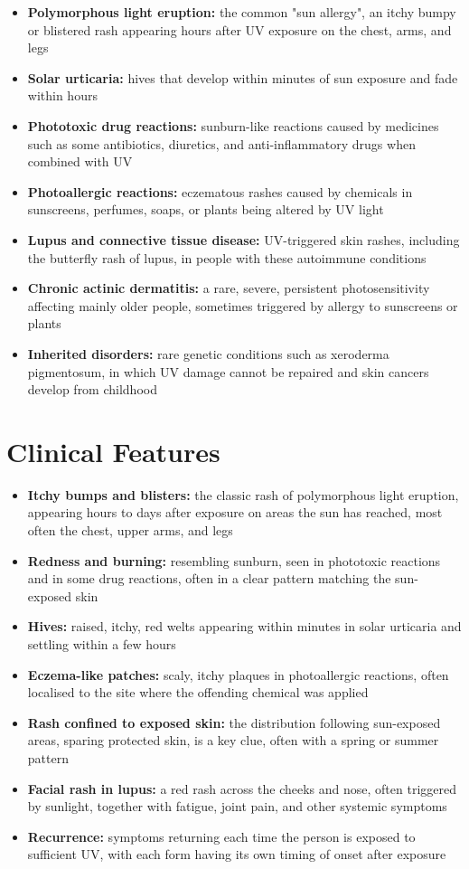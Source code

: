 \begin{itemize}
    \item \textbf{Polymorphous light eruption:} the common "sun allergy", an itchy bumpy or blistered rash appearing hours after UV exposure on the chest, arms, and legs
    \item \textbf{Solar urticaria:} hives that develop within minutes of sun exposure and fade within hours
    \item \textbf{Phototoxic drug reactions:} sunburn-like reactions caused by medicines such as some antibiotics, diuretics, and anti-inflammatory drugs when combined with UV
    \item \textbf{Photoallergic reactions:} eczematous rashes caused by chemicals in sunscreens, perfumes, soaps, or plants being altered by UV light
    \item \textbf{Lupus and connective tissue disease:} UV-triggered skin rashes, including the butterfly rash of lupus, in people with these autoimmune conditions
    \item \textbf{Chronic actinic dermatitis:} a rare, severe, persistent photosensitivity affecting mainly older people, sometimes triggered by allergy to sunscreens or plants
    \item \textbf{Inherited disorders:} rare genetic conditions such as xeroderma pigmentosum, in which UV damage cannot be repaired and skin cancers develop from childhood
\end{itemize}

\section*{Clinical Features}
\begin{itemize}
    \item \textbf{Itchy bumps and blisters:} the classic rash of polymorphous light eruption, appearing hours to days after exposure on areas the sun has reached, most often the chest, upper arms, and legs
    \item \textbf{Redness and burning:} resembling sunburn, seen in phototoxic reactions and in some drug reactions, often in a clear pattern matching the sun-exposed skin
    \item \textbf{Hives:} raised, itchy, red welts appearing within minutes in solar urticaria and settling within a few hours
    \item \textbf{Eczema-like patches:} scaly, itchy plaques in photoallergic reactions, often localised to the site where the offending chemical was applied
    \item \textbf{Rash confined to exposed skin:} the distribution following sun-exposed areas, sparing protected skin, is a key clue, often with a spring or summer pattern
    \item \textbf{Facial rash in lupus:} a red rash across the cheeks and nose, often triggered by sunlight, together with fatigue, joint pain, and other systemic symptoms
    \item \textbf{Recurrence:} symptoms returning each time the person is exposed to sufficient UV, with each form having its own timing of onset after exposure
\end{itemize}

